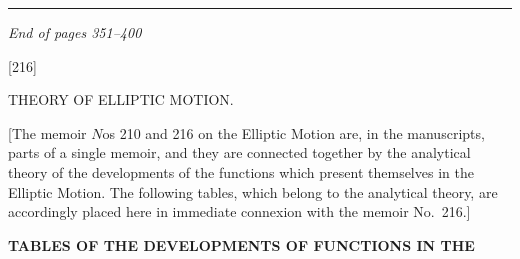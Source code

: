\documentclass[11pt,a4paper]{book}
\begin{document}
{{\vspace{2em}

\begin{center}
\rule{0.5\textwidth}{0.4pt}

\textit{End of pages 351--400}
\end{center}
\clearpage


\begin{center}
\Large[216]

\vspace{0.5em}
\Large THEORY OF ELLIPTIC MOTION.
\end{center}

\vspace{1em}

\noindent
{\small [The memoir \(N\)os 210 and 216 on the Elliptic Motion are, in the manuscripts, parts of a single memoir, and they are connected together by the analytical theory of the developments of the functions which present themselves in the Elliptic Motion.  The following tables, which belong to the analytical theory, are accordingly placed here in immediate connexion with the memoir No.\ 216.]}

\vspace{1em}

\begin{center}
\textbf{\large TABLES OF THE DEVELOPMENTS OF FUNCTIONS IN THE}
\end{center}

\vspace{0.5em}


}}
\end{document}
